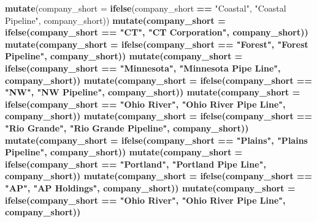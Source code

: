 \documentclass[]{article}
\newenvironment{Shaded}{\begin{snugshade}}{\end{snugshade}}
\newcommand{\KeywordTok}[1]{\textcolor[rgb]{0.13,0.29,0.53}{\textbf{#1}}}
\newcommand{\DataTypeTok}[1]{\textcolor[rgb]{0.13,0.29,0.53}{#1}}
\newcommand{\StringTok}[1]{\textcolor[rgb]{0.31,0.60,0.02}{#1}}
\newcommand{\OperatorTok}[1]{\textcolor[rgb]{0.81,0.36,0.00}{\textbf{#1}}}
\newcommand{\NormalTok}[1]{#1}
\begin{document}
\begin{Shaded}
\begin{Highlighting}[]
{{{{{{{{{{{{{{{{{{{{{{{{{{{{{{{{{{{{{{{{\StringTok{  }\KeywordTok{mutate}\NormalTok{(}\DataTypeTok{company_short =} \KeywordTok{ifelse}\NormalTok{(company_short }\OperatorTok{==}\StringTok{ "Coastal"}\NormalTok{, }\StringTok{"Coastal Pipeline"}\NormalTok{, company_short)) }\OperatorTok{%
\StringTok{  }\KeywordTok{mutate}\NormalTok{(}\DataTypeTok{company_short =} \KeywordTok{ifelse}\NormalTok{(company_short }\OperatorTok{==}\StringTok{ "CT"}\NormalTok{, }\StringTok{"CT Corporation"}\NormalTok{, company_short)) }\OperatorTok{%
\StringTok{  }\KeywordTok{mutate}\NormalTok{(}\DataTypeTok{company_short =} \KeywordTok{ifelse}\NormalTok{(company_short }\OperatorTok{==}\StringTok{ "Forest"}\NormalTok{, }\StringTok{"Forest Pipeline"}\NormalTok{, company_short)) }\OperatorTok{%
\StringTok{  }\KeywordTok{mutate}\NormalTok{(}\DataTypeTok{company_short =} \KeywordTok{ifelse}\NormalTok{(company_short }\OperatorTok{==}\StringTok{ "Minnesota"}\NormalTok{, }\StringTok{"Minnesota Pipe Line"}\NormalTok{, company_short)) }\OperatorTok{%
\StringTok{  }\KeywordTok{mutate}\NormalTok{(}\DataTypeTok{company_short =} \KeywordTok{ifelse}\NormalTok{(company_short }\OperatorTok{==}\StringTok{ "NW"}\NormalTok{, }\StringTok{"NW Pipeline"}\NormalTok{, company_short)) }\OperatorTok{%
\StringTok{  }\KeywordTok{mutate}\NormalTok{(}\DataTypeTok{company_short =} \KeywordTok{ifelse}\NormalTok{(company_short }\OperatorTok{==}\StringTok{ "Ohio River"}\NormalTok{, }\StringTok{"Ohio River Pipe Line"}\NormalTok{, company_short)) }\OperatorTok{%
\StringTok{  }\KeywordTok{mutate}\NormalTok{(}\DataTypeTok{company_short =} \KeywordTok{ifelse}\NormalTok{(company_short }\OperatorTok{==}\StringTok{ "Rio Grande"}\NormalTok{, }\StringTok{"Rio Grande Pipeline"}\NormalTok{, company_short)) }\OperatorTok{%
\StringTok{  }\KeywordTok{mutate}\NormalTok{(}\DataTypeTok{company_short =} \KeywordTok{ifelse}\NormalTok{(company_short }\OperatorTok{==}\StringTok{ "Plains"}\NormalTok{, }\StringTok{"Plains Pipeline"}\NormalTok{, company_short)) }\OperatorTok{%
\StringTok{  }\KeywordTok{mutate}\NormalTok{(}\DataTypeTok{company_short =} \KeywordTok{ifelse}\NormalTok{(company_short }\OperatorTok{==}\StringTok{ "Portland"}\NormalTok{, }\StringTok{"Portland Pipe Line"}\NormalTok{, company_short)) }\OperatorTok{%
\StringTok{  }\KeywordTok{mutate}\NormalTok{(}\DataTypeTok{company_short =} \KeywordTok{ifelse}\NormalTok{(company_short }\OperatorTok{==}\StringTok{ "AP"}\NormalTok{, }\StringTok{"AP Holdings"}\NormalTok{, company_short)) }\OperatorTok{%
\StringTok{  }\KeywordTok{mutate}\NormalTok{(}\DataTypeTok{company_short =} \KeywordTok{ifelse}\NormalTok{(company_short }\OperatorTok{==}\StringTok{ "Ohio River"}\NormalTok{, }\StringTok{"Ohio River Pipe Line"}\NormalTok{, company_short)) }\OperatorTok{%
}}}}}}}}}}}}}}}}}}}}}}}}}}}}}}}}}}}}}}}}}}}}}}}}}}}
\end{Highlighting}
\end{Shaded}
\end{document}
